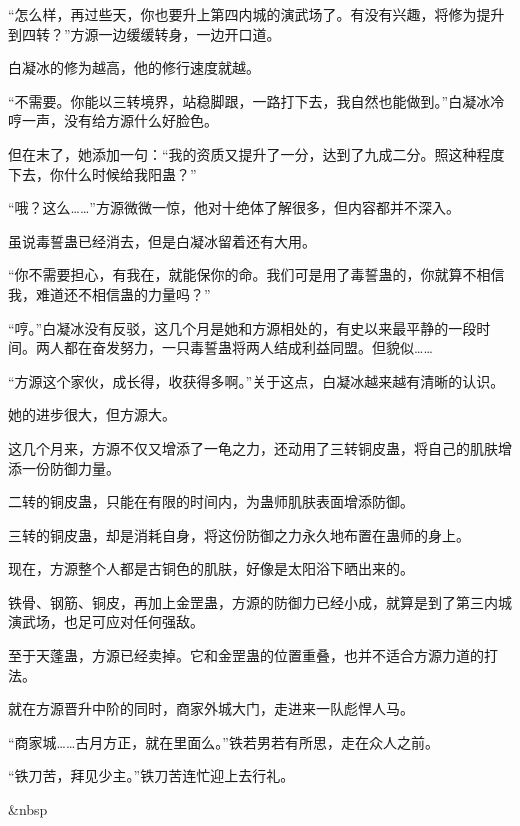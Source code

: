 \begin{this_body}
“怎么样，再过些天，你也要升上第四内城的演武场了。有没有兴趣，将修为提升到四转？”方源一边缓缓转身，一边开口道。

白凝冰的修为越高，他的修行速度就越。

“不需要。你能以三转境界，站稳脚跟，一路打下去，我自然也能做到。”白凝冰冷哼一声，没有给方源什么好脸色。

但在末了，她添加一句：“我的资质又提升了一分，达到了九成二分。照这种程度下去，你什么时候给我阳蛊？”

“哦？这么……”方源微微一惊，他对十绝体了解很多，但内容都并不深入。

虽说毒誓蛊已经消去，但是白凝冰留着还有大用。

“你不需要担心，有我在，就能保你的命。我们可是用了毒誓蛊的，你就算不相信我，难道还不相信蛊的力量吗？”

“哼。”白凝冰没有反驳，这几个月是她和方源相处的，有史以来最平静的一段时间。两人都在奋发努力，一只毒誓蛊将两人结成利益同盟。但貌似……

“方源这个家伙，成长得，收获得多啊。”关于这点，白凝冰越来越有清晰的认识。

她的进步很大，但方源大。

这几个月来，方源不仅又增添了一龟之力，还动用了三转铜皮蛊，将自己的肌肤增添一份防御力量。

二转的铜皮蛊，只能在有限的时间内，为蛊师肌肤表面增添防御。

三转的铜皮蛊，却是消耗自身，将这份防御之力永久地布置在蛊师的身上。

现在，方源整个人都是古铜色的肌肤，好像是太阳浴下晒出来的。

铁骨、钢筋、铜皮，再加上金罡蛊，方源的防御力已经小成，就算是到了第三内城演武场，也足可应对任何强敌。

至于天蓬蛊，方源已经卖掉。它和金罡蛊的位置重叠，也并不适合方源力道的打法。

就在方源晋升中阶的同时，商家外城大门，走进来一队彪悍人马。

“商家城……古月方正，就在里面么。”铁若男若有所思，走在众人之前。

“铁刀苦，拜见少主。”铁刀苦连忙迎上去行礼。

\&nbsp

\end{this_body}

